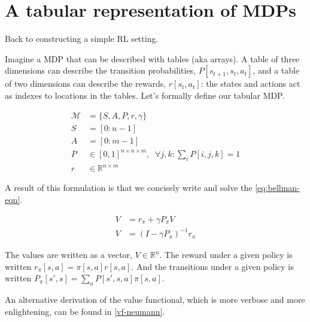 \section{A tabular representation of MDPs}

Back to constructing a simple RL setting.

Imagine a MDP that can be described with tables (aka arrays). A table of
three dimensions can describe the transition probabilities, $P[s_{t+1}, s_t, a_t]$,
and a table of two dimensions can describe the rewards, $r[s_t, a_t]$: the
states and actions act as indexes to locations in the tables.
Let's formally define our tabular MDP. \footnotemark[23]


\begin{align}
\mathcal M &= \{S, A, P, r, \gamma\}\; \tag{the MDP}\\
S &= [0:n-1] \tag{the state space}\\
A &= [0:m-1] \tag{the action space}\\
P &\in [0,1]^{n\times n \times m}, \;\;\forall j, k : \sum_i P[i, j, k] = 1 \tag{the transition fn}\\
r &\in \mathbb R^{n\times m} \tag{the reward fn}
\end{align}

A result of this formulation is that we concisely write and solve the \eqref{eq:bellman-eqn}. \footnotemark[0]


\begin{align}
V &= r_{\pi} + \gamma P_{\pi} V \tag{tabular Bellman eqn}\\
V &= (I-\gamma P_{\pi})^{-1}r_{\pi}  \label{eq:value-functional}\tag{Value functional}
\end{align}

The values are written as a vector, $V \in \mathbb R^n$.
The reward under a given policy is written $r_{\pi}[s, a] = \pi[s, a] r[s, a]$.
And the transitions under a given policy is written $P_{\pi}[s', s] = \sum_a P[s', s, a]\pi[s, a]$.

An alternative derivation of the value functional, which is more verbose and more enlightening, can be found in \ref{vf-neumann}.

